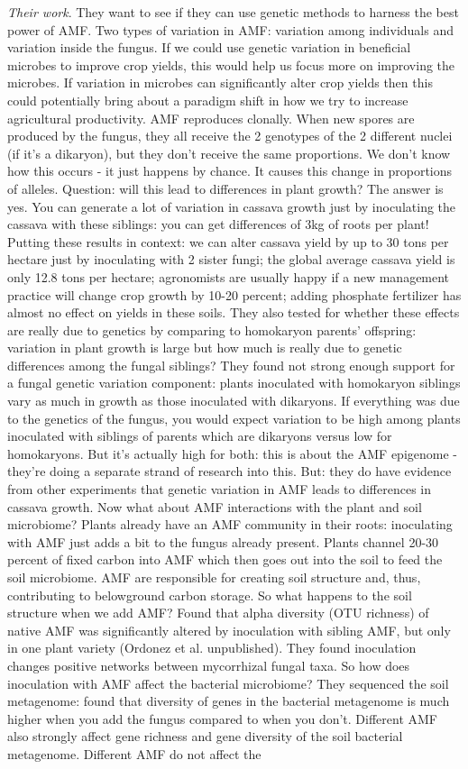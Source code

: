\documentclass[9pt]{article}
\begin{document}
	\textit{Their work}. They want to see if they can use genetic methods to harness the best power of AMF. Two types of variation in AMF: variation among individuals and variation inside the fungus. If we could use genetic variation in beneficial microbes to improve crop yields, this would help us focus more on improving the microbes. If variation in microbes can significantly alter crop yields then this could potentially bring about a paradigm shift in how we try to increase agricultural productivity. AMF reproduces clonally. When new spores are produced by the fungus, they all receive the 2 genotypes of the 2 different nuclei (if it's a dikaryon), but they don't receive the same proportions. We don't know how this occurs - it just happens by chance. It causes this change in proportions of alleles. Question: will this lead to differences in plant growth? The answer is yes. You can generate a lot of variation in cassava growth just by inoculating the cassava with these siblings: you can get differences of 3kg of roots per plant! Putting these results in context: we can alter cassava yield by up to 30 tons per hectare just by inoculating with 2 sister fungi; the global average cassava yield is only 12.8 tons per hectare; agronomists are usually happy if a new management practice will change crop growth by 10-20 percent; adding phosphate fertilizer has almost no effect on yields in these soils. They also tested for whether these effects are really due to genetics by comparing to homokaryon parents' offspring: variation in plant growth is large but how much is really due to genetic differences among the fungal siblings? They found not strong enough support for a fungal genetic variation component: plants inoculated with homokaryon siblings vary as much in growth as those inoculated with dikaryons. If everything was due to the genetics of the fungus, you would expect variation to be high among plants inoculated with siblings of parents which are dikaryons versus low for homokaryons. But it's actually high for both: this is about the AMF epigenome - they're doing a separate strand of research into this. But: they do have evidence from other experiments that genetic variation in AMF leads to differences in cassava growth. Now what about AMF interactions with the plant and soil microbiome? Plants already have an AMF community in their roots: inoculating with AMF just adds a bit to the fungus already present. Plants channel 20-30 percent of fixed carbon into AMF which then goes out into the soil to feed the soil microbiome. AMF are responsible for creating soil structure and, thus, contributing to belowground carbon storage. So what happens to the soil structure when we add AMF? Found that alpha diversity (OTU richness) of native AMF was significantly altered by inoculation with sibling AMF, but only in one plant variety (Ordonez et al. unpublished). They found inoculation changes positive networks between mycorrhizal fungal taxa. So how does inoculation with AMF affect the bacterial microbiome? They sequenced the soil metagenome: found that diversity of genes in the bacterial metagenome is much higher when you add the fungus compared to when you don't. Different AMF also strongly affect gene richness and gene diversity of the soil bacterial metagenome. Different AMF do not affect the 
\end{document}

